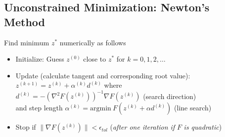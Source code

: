 \documentclass[english]{latex4ei/latex4ei_sheet}
\begin{document}
\begin{sectionbox}
\subsection{Unconstrained Minimization: Newton's Method}
Find minimum $z^{*}$ numerically as follows
\begin{itemize}
    \item Initialize: Guess $z^{(0)}$ close to $z^{*}$ for $k=0,1,2,\ldots$
    \item Update (calculate tangent and corresponding root value):\\
    $z^{(k+1)}=z^{(k)}+\alpha^{(k)} d^{(k)}$ where\\ $d^{(k)}=-\left(\nabla^{2} F\left(z^{(k)}\right)\right)^{-1} \nabla F\left(z^{(k)}\right)$ (search direction)\\
    and step length $\alpha^{(k)}=\textrm{argmin}\ F(z^{(k)}+\alpha d^{(k)})$ (line search)
    \item Stop if $\|\nabla F(z^{(k)})\|<\epsilon_{tol}$ (\textit{after one iteration if} $F$ \textit{is quadratic})
\end{itemize}\vspace{0.2cm}


\end{sectionbox}
\end{document}
